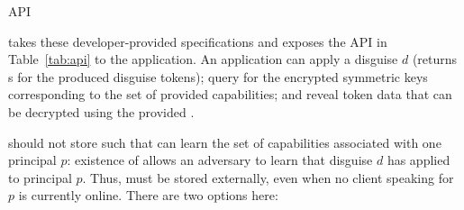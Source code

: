 \begin{table*}[t!]

\caption{\sys API}
\label{tab:api}
\end{table*}

\sys takes these developer-provided specifications and exposes the API in Table~\ref{tab:api} to the
application. 
An application can apply a disguise $d$ (\sys returns s for the produced disguise tokens); 
query for the encrypted symmetric keys corresponding to the set of provided capabilities; and 
reveal token data that can be decrypted using the provided \symk{}.

 \sys should not store  such that \sys can learn the
set of capabilities associated with one principal $p$: existence of  allows an adversary to
learn that disguise $d$ has applied to principal $p$. Thus,  must be stored externally,
even when no client speaking for $p$ is currently online.
There are two options here: 

